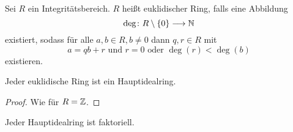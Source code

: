 \documentclass[12pt,a4paper]{scrartcl}
\begin{document}
\begin{defi} Sei $R$ ein Integritätsbereich. $R$ heißt euklidischer Ring, falls eine Abbildung
	$$\deg \colon R\setminus\{0\} \longrightarrow \mathbb N$$
	existiert, sodass für alle $a,b\in R, b\neq 0$ dann $q, r\in R$ mit \[a = qb+r \text{ und $r = 0$ oder $\deg(r)<\deg(b)$}\] existieren.
\end{defi}

\begin{satz}
	Jeder euklidische Ring ist ein Hauptidealring.
\end{satz}
\begin{proof}
	Wie für $R = \mathbb Z$.
\end{proof}

\begin{satz}
	Jeder Hauptidealring ist faktoriell.
\end{satz}
\end{document}
